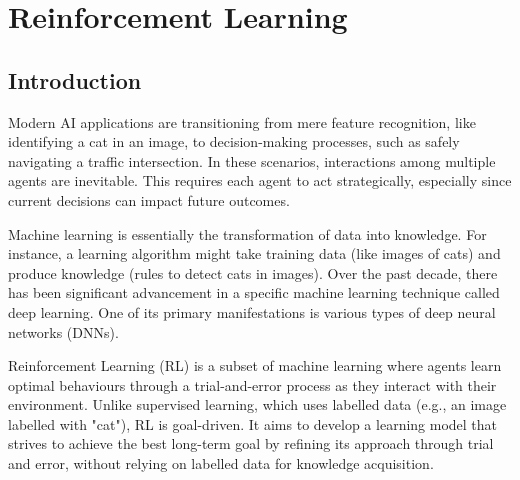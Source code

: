 \chapter{Reinforcement Learning}\label{chap:marl}

\minitoc%
\newcommand{\RS}{\mathcal{S}}
\newcommand{\RA}{\mathcal{A}}
\newcommand{\RP}{\mathcal{P}}
\newcommand{\RR}{\mathcal{R}}
\newcommand{\RE}{\mathbb{E}}

\section{Introduction}
Modern AI applications are transitioning from mere feature recognition, like identifying a cat in an image, to decision-making processes, such as safely navigating a traffic intersection. In these scenarios, interactions among multiple agents are inevitable. This requires each agent to act strategically, especially since current decisions can impact future outcomes.

Machine learning is essentially the transformation of data into knowledge. For instance, a learning algorithm might take training data (like images of cats) and produce knowledge (rules to detect cats in images). Over the past decade, there has been significant advancement in a specific machine learning technique called deep learning. One of its primary manifestations is various types of deep neural networks (DNNs).

Reinforcement Learning (RL) is a subset of machine learning where agents learn optimal behaviours through a trial-and-error process as they interact with their environment. Unlike supervised learning, which uses labelled data (e.g., an image labelled with "cat"), RL is goal-driven. It aims to develop a learning model that strives to achieve the best long-term goal by refining its approach through trial and error, without relying on labelled data for knowledge acquisition.
